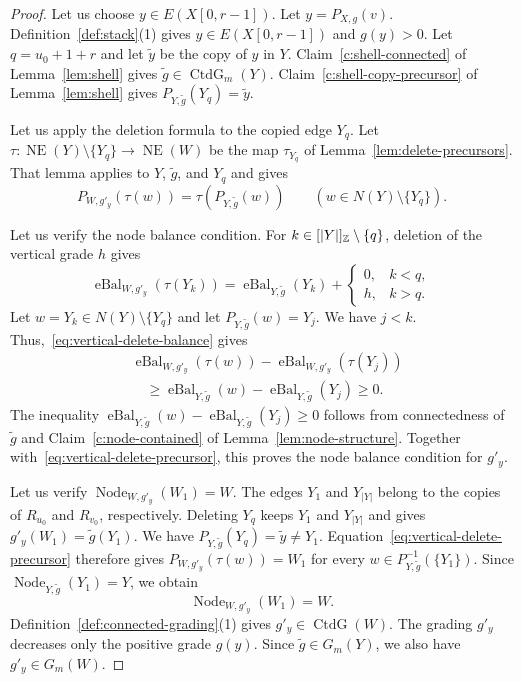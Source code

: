 \begin{proof}
 Let us choose $y\in E(X[0,r-1])$.
Let $y=P_{X,g}(v)$.
Definition~\ref{def:stack}(1) gives $y\in E(X[0,r-1])$ and $g(y)>0$.
Let $q=u_0+1+r$ and let $\widetilde y$ be the copy of $y$ in $Y$.
Claim~\ref{c:shell-connected} of Lemma~\ref{lem:shell} gives
$\widetilde g\in\operatorname{CtdG}_m(Y)$.
Claim~\ref{c:shell-copy-precursor} of Lemma~\ref{lem:shell} gives
$P_{Y,\widetilde g}(Y_q)=\widetilde y$.

Let us apply the deletion formula to the copied edge $Y_q$.
Let $\tau\colon\operatorname{NE}(Y)\setminus\{Y_q\}\to\operatorname{NE}(W)$
be the map $\tau_{Y_q}$ of Lemma~\ref{lem:delete-precursors}.
That lemma applies to $Y$, $\widetilde g$, and $Y_q$ and gives
\begin{equation}\label{eq:vertical-delete-precursor}
 P_{W,g'_y}(\tau(w))=\tau(P_{Y,\widetilde g}(w))
 \qquad(w\in N(Y)\setminus\{Y_q\}).
\end{equation}

Let us verify the node balance condition.
For $k\in[|Y|]_{\mathbb Z}\setminus\{q\}$, deletion of the vertical grade $h$ gives
\begin{equation}\label{eq:vertical-delete-balance}
 \operatorname{eBal}_{W,g'_y}(\tau(Y_k))
 =\operatorname{eBal}_{Y,\widetilde g}(Y_k)
 +\begin{cases}0,&k<q,\\h,&k>q.\end{cases}
\end{equation}
Let $w=Y_k\in N(Y)\setminus\{Y_q\}$ and let
$P_{Y,\widetilde g}(w)=Y_j$.
We have $j<k$. Thus,~\eqref{eq:vertical-delete-balance} gives
\[
\begin{aligned}
 &\operatorname{eBal}_{W,g'_y}(\tau(w))
 -\operatorname{eBal}_{W,g'_y}(\tau(Y_j))\\
 &\quad\ge\operatorname{eBal}_{Y,\widetilde g}(w)
 -\operatorname{eBal}_{Y,\widetilde g}(Y_j)\ge0.
\end{aligned}
\]
The inequality $\operatorname{eBal}_{Y,\widetilde g}(w)-\operatorname{eBal}_{Y,\widetilde g}(Y_j)\ge0$ follows from connectedness of $\widetilde g$ and
Claim~\ref{c:node-contained} of Lemma~\ref{lem:node-structure}.
Together with~\eqref{eq:vertical-delete-precursor}, this proves the node balance condition for $g'_y$.

Let us verify $\operatorname{Node}_{W,g'_y}(W_1)=W$.
The edges $Y_1$ and $Y_{|Y|}$ belong to the copies of $R_{u_0}$ and $R_{v_0}$, respectively.
Deleting $Y_q$ keeps $Y_1$ and $Y_{|Y|}$ and gives $g'_y(W_1)=\widetilde g(Y_1)$.
We have $P_{Y,\widetilde g}(Y_q)=\widetilde y\ne Y_1$.
Equation~\eqref{eq:vertical-delete-precursor} therefore gives $P_{W,g'_y}(\tau(w))=W_1$ for every $w\in P_{Y,\widetilde g}^{-1}(\{Y_1\})$.
Since $\operatorname{Node}_{Y,\widetilde g}(Y_1)=Y$, we obtain
\[
 \operatorname{Node}_{W,g'_y}(W_1)=W.
\]
Definition~\ref{def:connected-grading}(1) gives $g'_y\in\operatorname{CtdG}(W)$.
The grading $g'_y$ decreases only the positive grade $g(y)$.
Since $\widetilde g\in G_m(Y)$, we also have $g'_y\in G_m(W)$.


\end{proof}
